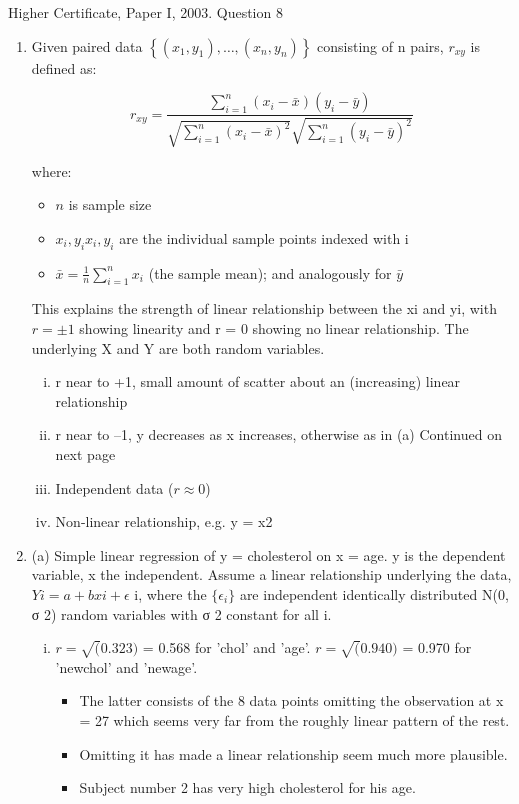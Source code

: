 \documentclass[a4paper,12pt]{article}
\begin{document}
Higher Certificate, Paper I, 2003. Question 8

\begin{enumerate}
\item
Given paired data ${\displaystyle \left\{(x_{1},y_{1}),\ldots ,(x_{n},y_{n})\right\}} $ consisting of n  pairs, $ {\displaystyle r_{xy}}$ is defined as: 



\[  {\displaystyle r_{xy}={\frac {\sum _{i=1}^{n}(x_{i}-{\bar {x}})(y_{i}-{\bar {y}})}{{\sqrt {\sum _{i=1}^{n}(x_{i}-{\bar {x}})^{2}}}{\sqrt {\sum _{i=1}^{n}(y_{i}-{\bar {y}})^{2}}}}}}  \]



 
where:
\begin{itemize}
    \item ${\displaystyle n}$   is sample size
    \item $ {\displaystyle x_{i},y_{i}}  x_{i},y_{i}$ are the individual sample points indexed with i
    \item $ {\displaystyle {\bar {x}}={\frac {1}{n}}\sum _{i=1}^{n}x_{i}}$ (the sample mean); and analogously for $ {\displaystyle {\bar {y}}}  $
\end{itemize}


This explains the strength of linear relationship between the xi and yi, with
$r = \pm 1$ showing linearity and r = 0 showing no linear relationship. The
underlying X and Y are both random variables.
\begin{enumerate}[(i)]
\item r near to +1, small amount of scatter about an (increasing) linear
relationship
\item  r near to –1, y decreases as x increases, otherwise as in (a)
Continued on next page
\item  Independent data ($r \approx 0$)
\item Non-linear relationship, e.g. y = x2
\end{enumerate}
\item  (a) Simple linear regression of y = cholesterol on x = age. y is the
dependent variable, x the independent. Assume a linear relationship
underlying the data, $Yi = a + bxi + \epsilon$
i, where the $\{ \epsilon_i\}$
 are independent
identically distributed N(0, σ 2) random variables with σ 2 constant for
all i.
\begin{enumerate}[(i)]
\item $r = \sqrt(0.323)$ = 0.568 for 'chol' and 'age'.
$r = \sqrt(0.940)$ = 0.970 for 'newchol' and 'newage'.
\begin{itemize}
\item The latter consists of the 8 data points omitting the observation at
x = 27 which seems very far from the roughly linear pattern of the rest.
\item Omitting it has made a linear relationship seem much more plausible.
\item Subject number 2 has very high cholesterol for his age.
\end{itemize}



\end{enumerate}
\end{enumerate}
\end{document}
